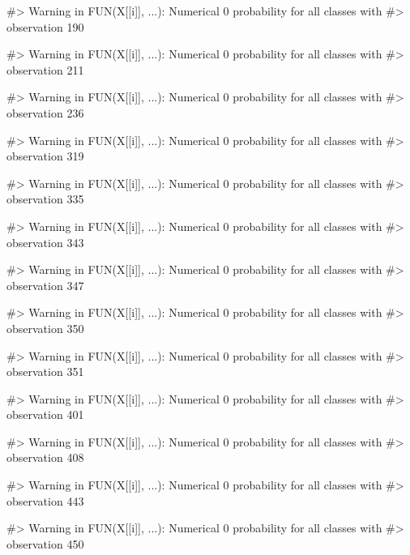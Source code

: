 \begin{Schunk}
\begin{Soutput}
#> Warning in FUN(X[[i]], ...): Numerical 0 probability for all classes with
#> observation 190
\end{Soutput}
\begin{Soutput}
#> Warning in FUN(X[[i]], ...): Numerical 0 probability for all classes with
#> observation 211
\end{Soutput}
\begin{Soutput}
#> Warning in FUN(X[[i]], ...): Numerical 0 probability for all classes with
#> observation 236
\end{Soutput}
\begin{Soutput}
#> Warning in FUN(X[[i]], ...): Numerical 0 probability for all classes with
#> observation 319
\end{Soutput}
\begin{Soutput}
#> Warning in FUN(X[[i]], ...): Numerical 0 probability for all classes with
#> observation 335
\end{Soutput}
\begin{Soutput}
#> Warning in FUN(X[[i]], ...): Numerical 0 probability for all classes with
#> observation 343
\end{Soutput}
\begin{Soutput}
#> Warning in FUN(X[[i]], ...): Numerical 0 probability for all classes with
#> observation 347
\end{Soutput}
\begin{Soutput}
#> Warning in FUN(X[[i]], ...): Numerical 0 probability for all classes with
#> observation 350
\end{Soutput}
\begin{Soutput}
#> Warning in FUN(X[[i]], ...): Numerical 0 probability for all classes with
#> observation 351
\end{Soutput}
\begin{Soutput}
#> Warning in FUN(X[[i]], ...): Numerical 0 probability for all classes with
#> observation 401
\end{Soutput}
\begin{Soutput}
#> Warning in FUN(X[[i]], ...): Numerical 0 probability for all classes with
#> observation 408
\end{Soutput}
\begin{Soutput}
#> Warning in FUN(X[[i]], ...): Numerical 0 probability for all classes with
#> observation 443
\end{Soutput}
\begin{Soutput}
#> Warning in FUN(X[[i]], ...): Numerical 0 probability for all classes with
#> observation 450
\end{Soutput}

\end{Schunk}
